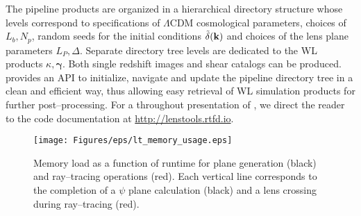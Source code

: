 The pipeline products are organized in a hierarchical directory structure whose levels correspond to specifications of $\Lambda$CDM cosmological parameters, choices of $L_b,N_p$, random seeds for the initial conditions $\tilde{\delta}(\mathbf{k})$ and choices of the lens plane parameters $L_P,\Delta$. Separate directory tree levels are dedicated to the WL products $\kappa,\pmb{\gamma}$. Both single redshift images and shear catalogs can be produced. \LT\, provides an API to initialize, navigate and update the pipeline directory tree in a clean and efficient way, thus allowing easy retrieval of WL simulation products for further post--processing. For a throughout presentation of \LT, we direct the reader to the code documentation at \url{http://lenstools.rtfd.io}. 
\begin{figure}
\begin{center}
\texttt{[image: Figures/eps/lt\_memory\_usage.eps]}
\end{center}
\caption{Memory load as a function of runtime for plane generation (black) and ray--tracing operations (red). Each vertical line corresponds to the completion of a $\psi$ plane calculation (black) and a lens crossing during ray--tracing (red).}
\label{fig:3:lt-memory}
\end{figure}
    

%